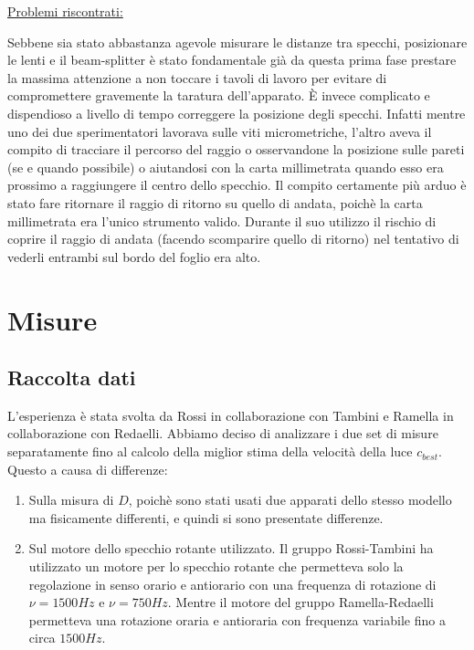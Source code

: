\documentclass{article}
\begin{document}
\underline{Problemi riscontrati:} 

Sebbene sia stato abbastanza agevole misurare le distanze tra specchi, posizionare le lenti e il beam-splitter è stato fondamentale già da questa prima fase prestare la 
massima attenzione a non toccare i tavoli di lavoro per evitare di compromettere gravemente la taratura dell'apparato.
È invece complicato e dispendioso a livello di tempo correggere la posizione degli specchi. Infatti mentre uno dei due sperimentatori lavorava sulle viti micrometriche,
l'altro aveva il compito di tracciare il percorso del raggio o osservandone la posizione sulle pareti (se e quando possibile) o aiutandosi con la carta millimetrata 
quando esso era prossimo a raggiungere il centro dello specchio.
Il compito certamente più arduo è stato fare ritornare il raggio di ritorno su quello di andata, poichè la carta millimetrata era l'unico strumento valido. Durante il suo utilizzo
il rischio di coprire il raggio di andata (facendo scomparire quello di ritorno) nel tentativo di vederli entrambi sul bordo del foglio era alto.


\newpage

\section{Misure}

\subsection{Raccolta dati} \label{raccolta_dati}
L'esperienza è stata svolta da Rossi in collaborazione con Tambini e Ramella in collaborazione con Redaelli. Abbiamo deciso di analizzare i due set di misure separatamente
fino al calcolo della miglior stima della velocità della luce $c_{best}$. Questo a causa di differenze:

\begin{enumerate}
    \item Sulla misura di $D$, poichè sono stati usati due apparati dello stesso modello ma fisicamente differenti, e quindi si sono presentate differenze.
    \item Sul motore dello specchio rotante utilizzato. Il gruppo Rossi-Tambini ha utilizzato un motore per lo specchio rotante che permetteva solo la regolazione in 
            senso orario e antiorario con una frequenza di rotazione di $\nu = 1500 Hz$ e $\nu = 750 Hz$. Mentre il motore del gruppo Ramella-Redaelli permetteva una rotazione
            oraria e antioraria con frequenza variabile fino a circa $1500 Hz$.
\end{enumerate}
\end{document}
